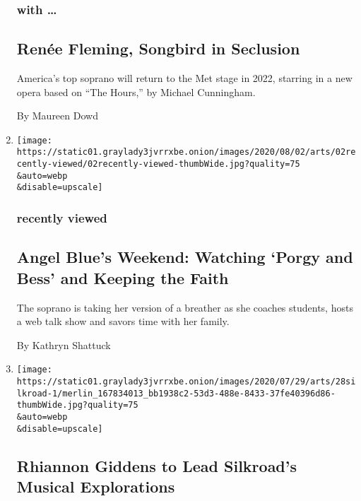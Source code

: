 \begin{enumerate}
  \hypertarget{with-}{%
  \subsubsection{with \ldots{}}\label{with-}}

  \hypertarget{renuxe9e-fleming-songbird-in-seclusion}{%
  \subsection{Renée Fleming, Songbird in
  Seclusion}\label{renuxe9e-fleming-songbird-in-seclusion}}

  America's top soprano will return to the Met stage in 2022, starring
  in a new opera based on ``The Hours,'' by Michael Cunningham.

  By Maureen Dowd
\item
  \href{/2020/07/28/arts/music/angel-blue-favorites.html}{}

  \texttt{[image: https://static01.graylady3jvrrxbe.onion/images/2020/08/02/arts/02recently-viewed/02recently-viewed-thumbWide.jpg?quality=75\\\&auto=webp\\\&disable=upscale]}

  \hypertarget{recently-viewed}{%
  \subsubsection{recently viewed}\label{recently-viewed}}

  \hypertarget{angel-blues-weekend-watching-porgy-and-bess-and-keeping-the-faith}{%
  \subsection{Angel Blue's Weekend: Watching `Porgy and Bess' and
  Keeping the
  Faith}\label{angel-blues-weekend-watching-porgy-and-bess-and-keeping-the-faith}}

  The soprano is taking her version of a breather as she coaches
  students, hosts a web talk show and savors time with her family.

  By Kathryn Shattuck
\item
  \href{/2020/07/28/arts/music/rhiannon-giddens-silkroad.html}{}

  \texttt{[image: https://static01.graylady3jvrrxbe.onion/images/2020/07/29/arts/28silkroad-1/merlin\_167834013\_bb1938c2-53d3-488e-8433-37fe40396d86-thumbWide.jpg?quality=75\\\&auto=webp\\\&disable=upscale]}

  \hypertarget{rhiannon-giddens-to-lead-silkroads-musical-explorations}{%
  \subsection{Rhiannon Giddens to Lead Silkroad's Musical
  Explorations}\label{rhiannon-giddens-to-lead-silkroads-musical-explorations}}


\end{enumerate}
